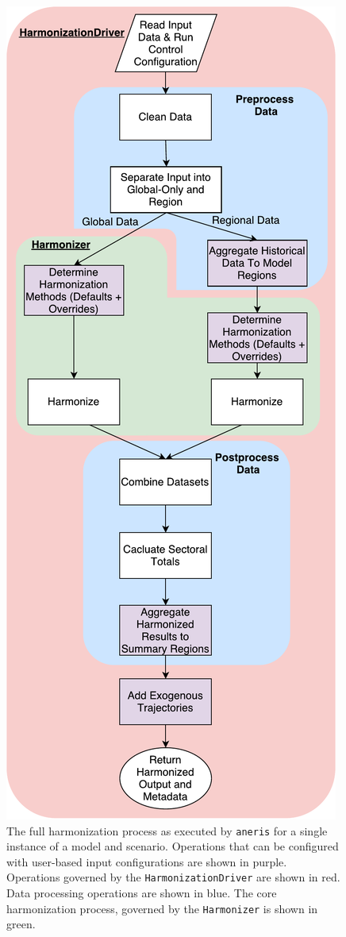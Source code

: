 \documentclass[review]{elsarticle}
\newcommand{\code}[1]{\lstinline[basicstyle=\ttfamily\color{black}]|#1|}
\begin{document}
\begin{figure}
  \begin{center}
    \includegraphics[height=0.8\textheight]{aneris-workflow.pdf}
    \caption[]{
      \label{fig:workflow}
The full harmonization process as executed by \code{aneris} for a single
instance of a model and scenario. Operations that can be configured with
user-based input configurations are shown in purple. Operations governed by the
\texttt{HarmonizationDriver} are shown in red. Data processing operations are
shown in blue. The core harmonization process, governed by the
\texttt{Harmonizer} is shown in green. }
  \end{center}
\end{figure}
\end{document}
